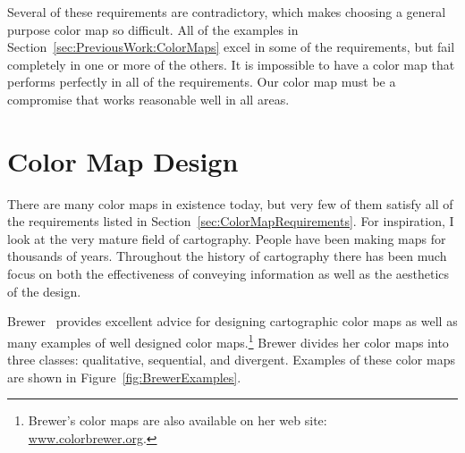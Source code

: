 \documentclass[twocolumn]{article}
\newcommand{\scite}[1]{~\cite{#1}}
\begin{document}

Several of these requirements are contradictory, which makes choosing a
general purpose color map so difficult.  All of the examples in
Section~\ref{sec:PreviousWork:ColorMaps} excel in some of the requirements,
but fail completely in one or more of the others.  It is impossible to have
a color map that performs perfectly in all of the requirements.  Our color
map must be a compromise that works reasonable well in all areas.


\section{Color Map Design}
\label{sec:ColorMapDesign}

There are many color maps in existence today, but very few of them satisfy
all of the requirements listed in Section~\ref{sec:ColorMapRequirements}.
For inspiration, I look at the very mature field of cartography.  People
have been making maps for thousands of years.  Throughout the history of
cartography there has been much focus on both the effectiveness of
conveying information as well as the aesthetics of the design.

Brewer\scite{Brewer05} provides excellent advice for designing cartographic
color maps as well as many examples of well designed color
maps.\footnote{Brewer's color maps are also available on her web site:
  \href{http://www.colorbrewer.org}{www.colorbrewer.org}.} Brewer divides
her color maps into three classes: qualitative, sequential, and divergent.
Examples of these color maps are shown in Figure~\ref{fig:BrewerExamples}.
\end{document}
